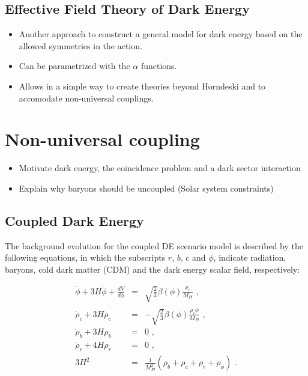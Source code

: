 \subsection{Effective Field Theory of Dark Energy \label{sub:EFT-of-DE}}
\begin{itemize}
\item Another approach to construct a general model for dark energy based
on the allowed symmetries in the action.
\item Can be parametrized with the $\alpha$ functions.
\item Allows in a simple way to create theories beyond Horndeski and to
accomodate non-universal couplings.
\end{itemize}

\section{Non-universal coupling \label{sec:nonuniversal-coupling}}

\begin{itemize}
\item Motivate dark energy, the coincidence problem and a dark sector interaction
\item Explain why baryons should be uncoupled (Solar system constraints)
\end{itemize}

\subsection{Coupled Dark Energy \label{sub:CDE}}

The background evolution for the coupled DE scenario model is described
by the following equations, in which the subscripts $r$, $b$, $c$
and $\phi$, indicate radiation, baryons, cold dark matter (CDM) and
the dark energy scalar field, respectively:

\begin{eqnarray}
\ddot{\phi}+3H\dot{\phi}+\frac{dV}{d\phi} & = & \sqrt{\frac{2}{3}}\beta(\phi)\frac{\rho_{c}}{M_{Pl}}\,\,,\label{eq:quint-kleingordon}\\
\dot{\rho}_{c}+3H\rho_{c} & = & -\sqrt{\frac{2}{3}}\beta(\phi)\frac{\rho_{c}\dot{\phi}}{M_{Pl}}\,\,,\label{eq:cdm-back-density}\\
\dot{\rho}_{b}+3H\rho_{b} & = & 0\,\,,\\
\dot{\rho}_{r}+4H\rho_{r} & = & 0\,\,,\\
3H^{2} & = & \frac{1}{M_{Pl}^{2}}(\rho_{b}+\rho_{c}+\rho_{r}+\rho_{\phi})\,\,.
\end{eqnarray}


